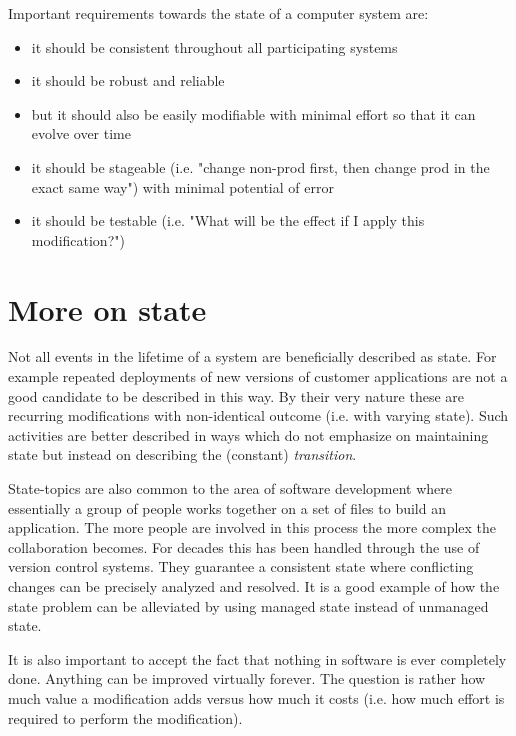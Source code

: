 \documentclass[12pt, a4paper]{article}
\begin{document}
\vspace{0.5cm}
\begin{minipage}{\textwidth}
Important requirements towards the state of a computer system are:

\begin{itemize}
  \item it should be consistent throughout all participating systems
  \item it should be robust and reliable
  \item but it should also be easily modifiable with minimal effort so that it can evolve over time
  \item it should be stageable (i.e. "change non-prod first, then change prod in the exact same way") with minimal potential of error
  \item it should be testable (i.e. "What will be the effect if I apply this modification?")
\end{itemize}
\end{minipage}
\vspace{0.5cm}

\section{More on state}
Not all events in the lifetime of a system are beneficially described as state. For example repeated deployments of new versions of customer applications are not a good candidate to be described in this way. By their very nature these are recurring modifications with non-identical outcome (i.e. with varying state). Such activities are better described in ways which do not emphasize on maintaining state but instead on describing the (constant) \textit{transition}.

State-topics are also common to the area of software development where essentially a group of people works together on a set of files to build an application. The more people are involved in this process the more complex the collaboration becomes. For decades this has been handled through the use of version control systems. They guarantee a consistent state where conflicting changes can be precisely analyzed and resolved. It is a good example of how the state problem can be alleviated by using managed state instead of unmanaged state.


It is also important to accept the fact that nothing in software is ever completely done. Anything can be improved virtually forever. The question is rather how much value a modification adds versus how much it costs (i.e. how much effort is required to perform the modification).
\end{document}
